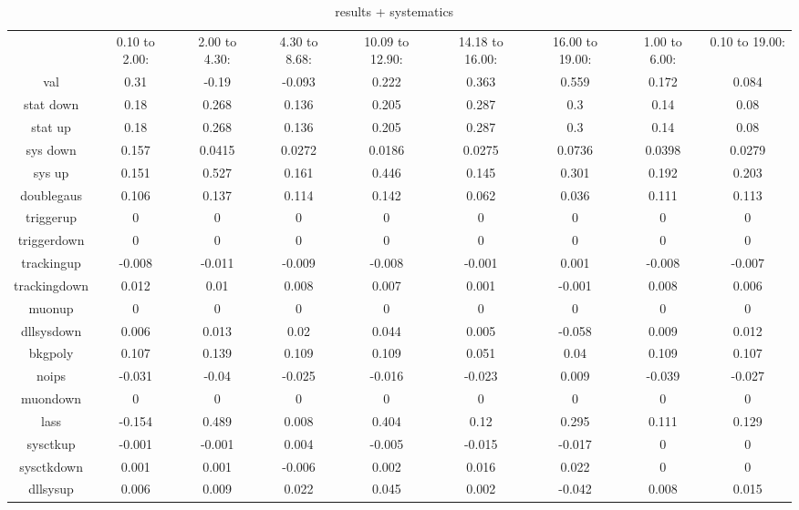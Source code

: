 {\begin{table}[tbp]
\caption{ \ASi results + systematics ~\label{tbl:swave:meas:as:results} }
\begin{tabular}{|c|c|c|c|c|c|c|c|c|}
\hline
 & 0.10 to  2.00: & 2.00 to  4.30: & 4.30 to  8.68: & 10.09 to  12.90: & 14.18 to  16.00: & 16.00 to  19.00: & 1.00 to  6.00: & 0.10 to  19.00:\\ 
val & 0.31 & -0.19 & -0.093 & 0.222 & 0.363 & 0.559 & 0.172 & 0.084\\ 
stat down & 0.18 & 0.268 & 0.136 & 0.205 & 0.287 & 0.3 & 0.14 & 0.08\\ 
stat up & 0.18 & 0.268 & 0.136 & 0.205 & 0.287 & 0.3 & 0.14 & 0.08\\ 
sys down & 0.157 & 0.0415 & 0.0272 & 0.0186 & 0.0275 & 0.0736 & 0.0398 & 0.0279\\ 
sys up & 0.151 & 0.527 & 0.161 & 0.446 & 0.145 & 0.301 & 0.192 & 0.203\\ 
doublegaus & 0.106 & 0.137 & 0.114 & 0.142 & 0.062 & 0.036 & 0.111 & 0.113\\ 
triggerup & 0 & 0 & 0 & 0 & 0 & 0 & 0 & 0\\ 
triggerdown & 0 & 0 & 0 & 0 & 0 & 0 & 0 & 0\\ 
trackingup & -0.008 & -0.011 & -0.009 & -0.008 & -0.001 & 0.001 & -0.008 & -0.007\\ 
trackingdown & 0.012 & 0.01 & 0.008 & 0.007 & 0.001 & -0.001 & 0.008 & 0.006\\ 
muonup & 0 & 0 & 0 & 0 & 0 & 0 & 0 & 0\\ 
dllsysdown & 0.006 & 0.013 & 0.02 & 0.044 & 0.005 & -0.058 & 0.009 & 0.012\\ 
bkgpoly & 0.107 & 0.139 & 0.109 & 0.109 & 0.051 & 0.04 & 0.109 & 0.107\\ 
noips & -0.031 & -0.04 & -0.025 & -0.016 & -0.023 & 0.009 & -0.039 & -0.027\\ 
muondown & 0 & 0 & 0 & 0 & 0 & 0 & 0 & 0\\ 
lass & -0.154 & 0.489 & 0.008 & 0.404 & 0.12 & 0.295 & 0.111 & 0.129\\ 
sysctkup & -0.001 & -0.001 & 0.004 & -0.005 & -0.015 & -0.017 & 0 & 0\\ 
sysctkdown & 0.001 & 0.001 & -0.006 & 0.002 & 0.016 & 0.022 & 0 & 0\\ 
dllsysup & 0.006 & 0.009 & 0.022 & 0.045 & 0.002 & -0.042 & 0.008 & 0.015\\ 
\hline
\end{tabular}
\end{table}
}
\clearpage

